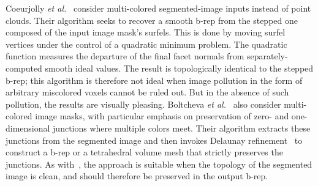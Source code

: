Coeurjolly \textit{et al.}~\cite{coeurjolly2021} consider multi-colored segmented-image inputs instead of point clouds.  Their algorithm seeks to recover a smooth b-rep from the stepped one composed of the input image mask's surfels.  This is done by moving surfel vertices under the control of a quadratic minimum problem.  The quadratic function measures the departure of the final facet normals from separately-computed smooth ideal values.  The result is topologically identical to the stepped b-rep; this algorithm is therefore not ideal when image pollution in the form of arbitrary miscolored voxels cannot be ruled out.  But in the absence of such pollution, the results are visually pleasing.  Boltcheva \textit{et al.}~\cite{boltcheva2009} also consider multi-colored image masks, with particular emphasis on preservation of zero- and one-dimensional junctions where multiple colors meet.  Their algorithm extracts these junctions from the segmented image and then invokes Delaunay refinement~\cite{pons2007} to construct a b-rep or a tetrahedral volume mesh that strictly preserves the junctions.  As with~\cite{coeurjolly2021}, the approach is suitable when the topology of the segmented image is clean, and should therefore be preserved in the output b-rep.

